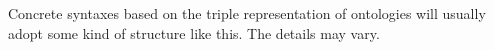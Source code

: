 Concrete syntaxes based on the triple representation of ontologies will usually adopt some kind of structure like this.
The details may vary.


